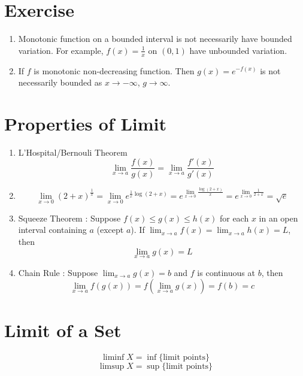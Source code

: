 \section*{Exercise}
\begin{enumerate}
	\item Monotonic function on a bounded interval is not necessarily have bounded variation. For example, $f(x) = \frac{1}{x}$ on $(0,1)$ have unbounded variation.
	\item If $f$ is monotonic non-decreasing function. Then $g(x) = e^{-f(x)}$ is not necessarily bounded as $x \to -\infty$, $g \to \infty$.
\end{enumerate}

\section{Properties of Limit}
\begin{enumerate}
	\item L'Hospital/Bernouli Theorem
	\[ \lim_{x \to a} \frac{f(x)}{g(x)} = \lim_{x \to a} \frac{f'(x)}{g'(x)} \]
	\item \[ \lim_{x \to 0} (2+x)^\frac{1}{x} = \lim_{x \to 0} e^{\frac{1}{x} \log (2+x)} = e^{\displaystyle \lim_{x \to 0} \frac{\log(2+x)}{x}} = e^{\displaystyle \lim_{x \to 0} \frac{1}{2+x}} = \sqrt{e} \]
	\item Squeeze Theorem :
	Suppose $f(x) \le g(x) \le h(x)$ for each $x$ in an open interval containing $a$ (except $a$).
	If $\displaystyle \lim_{x \to a} f(x) = \lim_{x \to a} h(x) = L$,  then
	\begin{equation}
		\lim_{x \to a} g(x) = L
		\label{equ:lim_squeeze}
	\end{equation}
	\item Chain Rule :
	Suppose $\displaystyle \lim_{x \to a} g(x) = b$ and $f$ is continuous at $b$, then
	\begin{equation}
		\lim_{x \to a} f(g(x)) = f(\lim_{x \to a} g(x)) = f(b) = c
	\end{equation}
\end{enumerate}

\section{Limit of a Set}
\begin{definition}
	\[ \liminf X = \inf \{ \text{limit points} \} \]
	\[ \limsup X = \sup \{ \text{limit points} \} \]
\end{definition}

